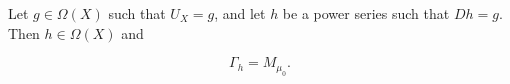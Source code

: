Let $g \in \Omega(X)$ such that $U_X = g$, and let $h$ be a power series such that $Dh = g$. Then $h \in \Omega(X)$ and

$$\Gamma_h = M_{\mu_0}.$$
